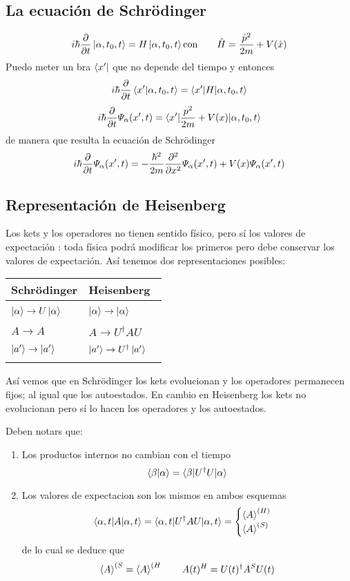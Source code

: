 \documentclass[10pt,oneside]{CBFT_book}
\begin{document}
\subsection{La ecuación de Schrödinger}

\[
	i\hbar\dpar{}{t}\Ket{\alpha,t_0,t} = H\Ket{\alpha,t_0,t} \text{con} 
	\qquad \hat{H} = \frac{\hat{p}^2}{2m} + V(\hat{x}) 
\]
Puedo meter un bra $\Bra{x'}$ que no depende del tiempo y entonces 
\[
	i\hbar\dpar{}{t}\braket{x'|\alpha,t_0,t} = \braket{x'|H|\alpha,t_0,t}
\]
\[
	i\hbar\dpar{}{t}\Psi_\alpha(x',t) = \braket{x'|\frac{p^2}{2m} + V(x)|\alpha,t_0,t}
\]
de manera que resulta la ecuación de Schrödinger
\[
	i\hbar\dpar{}{t}\Psi_\alpha(x',t) = -\frac{\hbar^2}{2m}\dpar[2]{}{x}\Psi_\alpha(x',t) + 
	V(x)\Psi_\alpha(x',t)
\]

\subsection{Representación de Heisenberg}

Los kets y los operadores no tienen sentido físico, pero sí los valores de expectación : toda física podrá modificar 
los primeros pero debe conservar los valores de expectación. Así tenemos dos representaciones posibles:

\begin{center}
\begin{tabular}{|l|l|}
\hline
Schrödinger & Heisenberg \\
\hline
& \\
$\Ket{\alpha} \to U\Ket{\alpha} \quad $ & $\Ket{\alpha} \to \Ket{\alpha} \quad $ \\
& \\
$A \to A \quad $ & $A \to U^\dagger AU \quad$ \\
& \\
$\Ket{a'} \to \Ket{a'} \quad $ & $\Ket{a'} \to U^\dagger \Ket{a'} \quad $ \\
& \\
\hline
\end{tabular}
\end{center}
Así vemos que en Schrödinger los kets evolucionan y los operadores permanecen fijos; al igual que los autoestados.
En cambio en Heisenberg los kets no evolucionan pero sí lo hacen los operadores y los autoestados.

Deben notars que:
\begin{enumerate}
 \item Los productos internos no cambian con el tiempo
 \[
	\braket{\beta|\alpha} = \braket{\beta|U^\dagger U|\alpha} 
 \]
 \item Los valores de expectacion son los mismos en ambos esquemas
 \[
	\braket{\alpha,t|A|\alpha,t} = \braket{\alpha,t|U^\dagger AU|\alpha,t} =
	\begin{cases}
	 \braket{A}^{(H)} \\
	 \braket{A}^{(S)}
	\end{cases}
 \]
 de lo cual se deduce que 
 \[
	\Braket{A}^{(S} = \Braket{A}^{(H} \qquad A(t)^H = U(t)^\dagger A^S U(t)
 \]
\end{enumerate}
\end{document}
